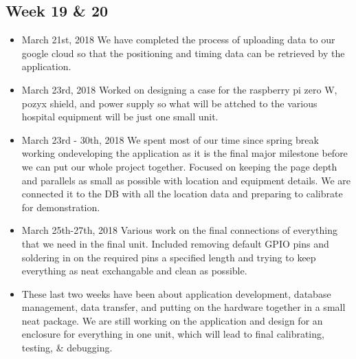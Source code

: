 \documentclass[12pt]{article}
\begin{document}
	\subsection{Week 19 \& 20}
		\begin{itemize}
			\item March 21st, 2018 We have completed the process of uploading data to our google cloud so that the positioning and timing data can be retrieved by the application.
			\item March 23rd, 2018 Worked on designing a case for the raspberry pi zero W, pozyx shield, and power supply so what will be attched to the various hospital equipment will be just one small unit.
			\item March 23rd - 30th, 2018 We spent most of our time since spring break working on\/developing the application as it is the final major milestone before we can put our whole project together. Focused on keeping the page depth and parallels as small as possible with location and equipment details. We are connected it to the DB with all the location data and preparing to calibrate for demonstration.
			\item March 25th-27th, 2018 Various work on the final connections of everything that we need in the final unit. Included removing default GPIO pins and soldering in on the required pins a specified length and trying to keep everything as neat exchangable and clean as possible. 
			\item These last two weeks have been about application development, database management, data transfer, and putting on the hardware together in a small neat package. We are still working on the application and design for an enclosure for everything in one unit, which will lead to final calibrating, testing, \& debugging.
		\end{itemize}
		
\end{document}
